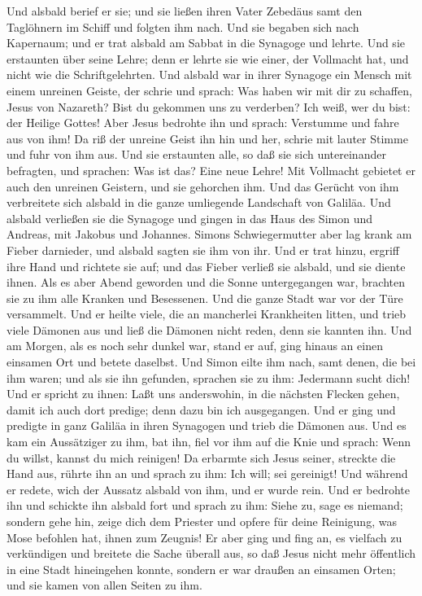  Und alsbald berief er sie; und sie ließen ihren Vater
Zebedäus samt den Taglöhnern im Schiff und folgten ihm nach.
 Und sie begaben sich nach Kapernaum; und er trat alsbald
am Sabbat in die Synagoge und lehrte.  Und sie erstaunten
über seine Lehre; denn er lehrte sie wie einer, der Vollmacht hat, und
nicht wie die Schriftgelehrten.  Und alsbald war in ihrer
Synagoge ein Mensch mit einem unreinen Geiste, der schrie
 und sprach: Was haben wir mit dir zu schaffen, Jesus von
Nazareth? Bist du gekommen uns zu verderben? Ich weiß, wer du bist: der
Heilige Gottes!  Aber Jesus bedrohte ihn und sprach:
Verstumme und fahre aus von ihm!  Da riß der unreine
Geist ihn hin und her, schrie mit lauter Stimme und fuhr von ihm aus.
 Und sie erstaunten alle, so daß sie sich untereinander
befragten, und sprachen: Was ist das? Eine neue Lehre! Mit Vollmacht
gebietet er auch den unreinen Geistern, und sie gehorchen ihm.
 Und das Gerücht von ihm verbreitete sich alsbald in die
ganze umliegende Landschaft von Galiläa.  Und alsbald
verließen sie die Synagoge und gingen in das Haus des Simon und Andreas,
mit Jakobus und Johannes.  Simons Schwiegermutter aber
lag krank am Fieber darnieder, und alsbald sagten sie ihm von ihr.
 Und er trat hinzu, ergriff ihre Hand und richtete sie
auf; und das Fieber verließ sie alsbald, und sie diente ihnen.
 Als es aber Abend geworden und die Sonne untergegangen
war, brachten sie zu ihm alle Kranken und Besessenen. 
Und die ganze Stadt war vor der Türe versammelt.  Und er
heilte viele, die an mancherlei Krankheiten litten, und trieb viele
Dämonen aus und ließ die Dämonen nicht reden, denn sie kannten ihn.
 Und am Morgen, als es noch sehr dunkel war, stand er
auf, ging hinaus an einen einsamen Ort und betete daselbst.
 Und Simon eilte ihm nach, samt denen, die bei ihm waren;
 und als sie ihn gefunden, sprachen sie zu ihm: Jedermann
sucht dich!  Und er spricht zu ihnen: Laßt uns
anderswohin, in die nächsten Flecken gehen, damit ich auch dort predige;
denn dazu bin ich ausgegangen.  Und er ging und predigte
in ganz Galiläa in ihren Synagogen und trieb die Dämonen aus.
 Und es kam ein Aussätziger zu ihm, bat ihn, fiel vor ihm
auf die Knie und sprach: Wenn du willst, kannst du mich reinigen!
 Da erbarmte sich Jesus seiner, streckte die Hand aus,
rührte ihn an und sprach zu ihm: Ich will; sei gereinigt!
 Und während er redete, wich der Aussatz alsbald von ihm,
und er wurde rein.  Und er bedrohte ihn und schickte ihn
alsbald fort  und sprach zu ihm: Siehe zu, sage es
niemand; sondern gehe hin, zeige dich dem Priester und opfere für deine
Reinigung, was Mose befohlen hat, ihnen zum Zeugnis!  Er
aber ging und fing an, es vielfach zu verkündigen und breitete die Sache
überall aus, so daß Jesus nicht mehr öffentlich in eine Stadt
hineingehen konnte, sondern er war draußen an einsamen Orten; und sie
kamen von allen Seiten zu ihm.

